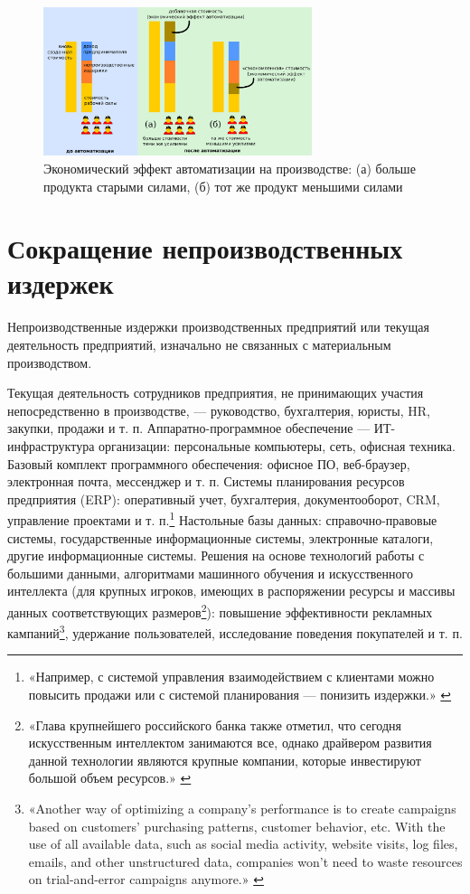 \documentclass{article}
\begin{document}
\begin{figure}[h]
    \centering
    \includegraphics[width=0.70\textwidth]{effect-manufacturing}
    \caption{Экономический эффект автоматизации на производстве: (а) больше продукта старыми силами, (б) тот же продукт меньшими силами}
    \label{fig:effect_manufacturing}
\end{figure}

\section*{Сокращение непроизводственных издержек}

Непроизводственные издержки производственных предприятий или текущая деятельность предприятий, изначально не связанных с материальным производством.

Текущая деятельность сотрудников предприятия, не принимающих участия непосредственно в производстве, — руководство, бухгалтерия, юристы, HR, закупки, продажи и т. п. Аппаратно-программное обеспечение — ИТ-инфраструктура организации: персональные компьютеры, сеть, офисная техника. Базовый комплект программного обеспечения: офисное ПО, веб-браузер, электронная почта, мессенджер и т. п. Системы планирования ресурсов предприятия (ERP): оперативный учет, бухгалтерия, документооборот, CRM, управление проектами и т. п.\footnote{«Например, с системой управления взаимодействием с клиентами можно повысить продажи или с системой планирования — понизить издержки.» \cite{vedomostiItIsReal}} Настольные базы данных: справочно-правовые системы, государственные информационные системы, электронные каталоги, другие информационные системы. Решения на основе технологий работы с большими данными, алгоритмами машинного обучения и искусственного интеллекта (для крупных игроков, имеющих в распоряжении ресурсы и массивы данных соответствующих размеров\footnote{«Глава крупнейшего российского банка также отметил, что сегодня искусственным интеллектом занимаются все, однако драйвером развития данной технологии являются крупные компании, которые инвестируют большой объем ресурсов.» \cite{sberAiLoss2019}}): повышение эффективности рекламных кампаний\footnote{«Another way of optimizing a company’s performance is to create campaigns based on customers’ purchasing patterns, customer behavior, etc. With the use of all available data, such as social media activity, website visits, log files, emails, and other unstructured data, companies won’t need to waste resources on trial-and-error campaigns anymore.» \cite{marketingBigData2022}}, удержание пользователей, исследование поведения покупателей и т. п.
\end{document}
